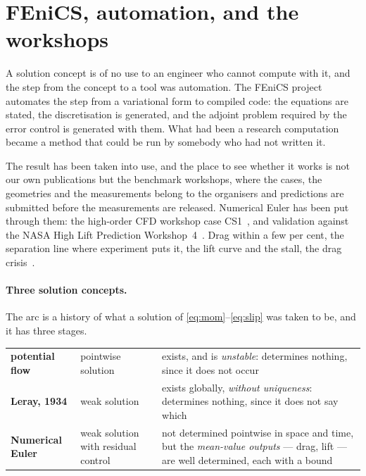 \documentclass[11pt]{article}
\begin{document}
\section{FEniCS, automation, and the workshops}\label{sec:fenics}

A solution concept is of no use to an engineer who cannot compute with it, and the step from the
concept to a tool was automation. The FEniCS project~\cite{fenics} automates the step from a
variational form to compiled code: the equations are stated, the discretisation is generated, and the
adjoint problem required by the error control is generated with them. What had been a research
computation became a method that could be run by somebody who had not written it.

The result has been taken into use, and the place to see whether it works is not our own publications
but the benchmark workshops, where the cases, the geometries and the measurements belong to the
organisers and predictions are submitted before the measurements are released. Numerical Euler has
been put through them: the high-order CFD workshop case CS1~\cite{cs1}, and validation against the
NASA High Lift Prediction Workshop~4~\cite{ifasd}. Drag within a few per cent, the separation line
where experiment puts it, the lift curve and the stall, the drag crisis~\cite{dragcrisis}.

\paragraph{Three solution concepts.} The arc is a history of what a solution of
\eqref{eq:mom}--\eqref{eq:slip} was taken to be, and it has three stages.

\begin{center}\small
\begin{tabular}{@{}llp{}@{}}
\hline
\textbf{potential flow} & pointwise solution & exists, and is \emph{unstable}: determines nothing,
since it does not occur \\[3pt]
\textbf{Leray, 1934} & weak solution & exists globally, \emph{without uniqueness}: determines
nothing, since it does not say which \\[3pt]
\textbf{Numerical Euler} & weak solution with residual control & not determined pointwise in space
and time, but the \emph{mean-value outputs} --- drag, lift --- are well determined, each with a
bound \\
\hline
\end{tabular}
\end{center}
\end{document}
